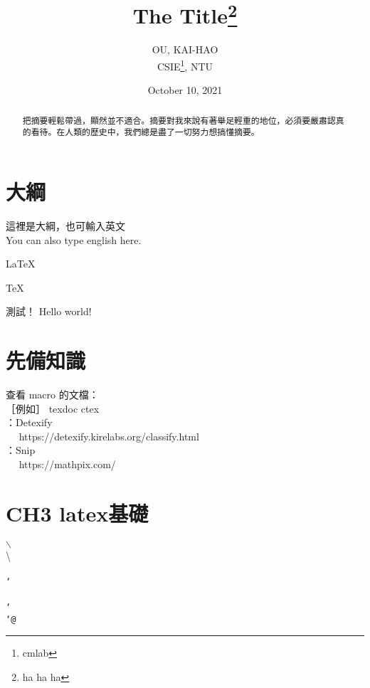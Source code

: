 \documentclass[12pt]{article}
\title{The Title\thanks{ha ha ha}}
\date{October 10, 2021}
\author{OU, KAI-HAO\\CSIE\thanks{cmlab}, NTU}
\begin{document}
\begin{CJK*}{UTF8}{bkai} %
	\maketitle
	\begin{abstract}
	把摘要輕鬆帶過，顯然並不適合。摘要對我來說有著舉足輕重的地位，必須要嚴肅認真的看待。在人類的歷史中，我們總是盡了一切努力想搞懂摘要。
	\end{abstract}
	
	\section{大綱}
	
	這裡是大綱，也可輸入英文 \\
	You can also type english here.
	
	\LaTeX
	
	\LaTeXe
	
	\TeX
	
	測試！ Hello world!
	
	\section{先備知識}
	
	查看 macro 的文檔：\\	
	［例如］ texdoc ctex \\
	
	：Detexify \\　
	https://detexify.kirelabs.org/classify.html \\
	
	：Snip \\　
	https://mathpix.com/ \\
	
	\section{CH3 latex基礎}
	
	$\backslash$  \\
	\textbackslash  \\
	\texttt{}  \\
	\texttt{\char`\\}  \\
	\texttt{\char`~}  \\
	\texttt{\char`@}  \\
		

\end{CJK*}
\end{document}
